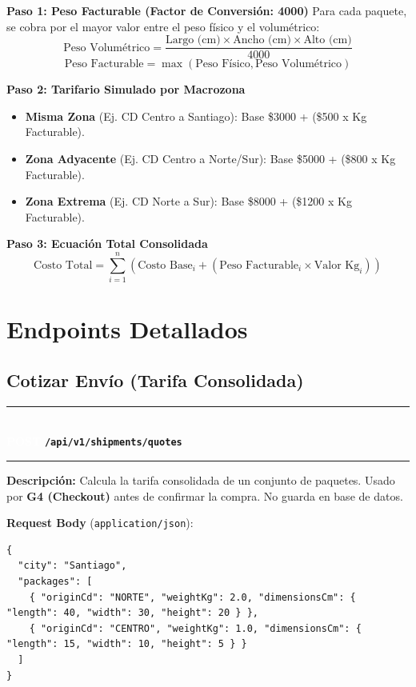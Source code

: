 \documentclass[11pt, a4paper]{article}
\newcommand{\httpmethod}[2]{%
  \colorbox{#1}{\textcolor{white}{\textbf{\small\textsf{#2}}}}%
}
\newcommand{\routeheader}[3]{%
  \noindent\rule{\textwidth}{1.5pt}\\[0.3em]
  \httpmethod{#1}{#2}\;\texttt{\bfseries #3}\\[0.3em]
  \rule{\textwidth}{0.4pt}
  \vspace{0.3cm}
}
\begin{document}
\textbf{Paso 1: Peso Facturable (Factor de Conversión: 4000)}
Para cada paquete, se cobra por el mayor valor entre el peso físico y el volumétrico:
$$ \text{Peso Volumétrico} = \frac{\text{Largo (cm)} \times \text{Ancho (cm)} \times \text{Alto (cm)}}{4000} $$
$$ \text{Peso Facturable} = \max(\text{Peso Físico}, \text{Peso Volumétrico}) $$

\textbf{Paso 2: Tarifario Simulado por Macrozona}
\begin{itemize}[noitemsep]
  \item \textbf{Misma Zona} (Ej. CD Centro a Santiago): Base \$3000 + (\$500 x Kg Facturable).
  \item \textbf{Zona Adyacente} (Ej. CD Centro a Norte/Sur): Base \$5000 + (\$800 x Kg Facturable).
  \item \textbf{Zona Extrema} (Ej. CD Norte a Sur): Base \$8000 + (\$1200 x Kg Facturable).
\end{itemize}

\textbf{Paso 3: Ecuación Total Consolidada}
$$ \text{Costo Total} = \sum_{i=1}^{n} \left( \text{Costo Base}_i + (\text{Peso Facturable}_i \times \text{Valor Kg}_i) \right) $$

\section{Endpoints Detallados}

\subsection{Cotizar Envío (Tarifa Consolidada)}

\routeheader{post}{POST}{/api/v1/shipments/quotes}

\textbf{Descripción:} Calcula la tarifa consolidada de un conjunto de paquetes. Usado por \textbf{G4 (Checkout)} antes de confirmar la compra. No guarda en base de datos.

\vspace{0.3cm}
\textbf{Request Body} (\texttt{application/json}):

\begin{lstlisting}
{
  "city": "Santiago",
  "packages": [
    { "originCd": "NORTE", "weightKg": 2.0, "dimensionsCm": { "length": 40, "width": 30, "height": 20 } },
    { "originCd": "CENTRO", "weightKg": 1.0, "dimensionsCm": { "length": 15, "width": 10, "height": 5 } }
  ]
}
\end{lstlisting}
\end{document}
